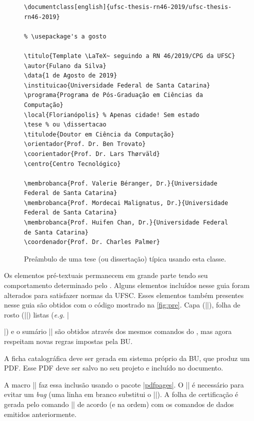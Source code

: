 \documentclass[embeddedlogo]{../ufsc-thesis-rn46-2019}
\begin{document}
\begin{figure}[tb]
  \centering
  \caption{Preâmbulo de uma tese (ou dissertação) típica usando esta classe.}
  \label{fig:preambulo}

  \begin{verbatim}
\documentclass[english]{ufsc-thesis-rn46-2019/ufsc-thesis-rn46-2019}

% \usepackage's a gosto

\titulo{Template \LaTeX~ seguindo a RN 46/2019/CPG da UFSC}
\autor{Fulano da Silva}
\data{1 de Agosto de 2019}
\instituicao{Universidade Federal de Santa Catarina}
\programa{Programa de Pós-Graduação em Ciências da Computação}
\local{Florianópolis} % Apenas cidade! Sem estado
\tese % ou \dissertacao
\titulode{Doutor em Ciência da Computação}
\orientador{Prof. Dr. Ben Trovato}
\coorientador{Prof. Dr. Lars Thørväld}
\centro{Centro Tecnológico}

\membrobanca{Prof. Valerie Béranger, Dr.}{Universidade Federal de Santa Catarina}
\membrobanca{Prof. Mordecai Malignatus, Dr.}{Universidade Federal de Santa Catarina}
\membrobanca{Prof. Huifen Chan, Dr.}{Universidade Federal de Santa Catarina}
\coordenador{Prof. Dr. Charles Palmer}
  \end{verbatim}
\end{figure}

Os elementos pré-textuais permanecem em grande parte tendo seu comportamento
determinado pelo \abnTeX. Alguns elementos incluídos nesse guia foram alterados
para satisfazer normas da UFSC. Esses elementos também presentes
nesse guia são obtidos com o código mostrado na \autoref{fig:pre}. Capa
(\mt|\imprimircapa|), folha de rosto (\mt|\imprimirfolhaderosto*|) listas
(\emph{e.g.} \mt|\listoffigures*|) e o sumário \mt|\tableofcontents*| são
obtidos através dos mesmos comandos do \abnTeX, mas agora respeitam novas
regras impostas pela BU.

A ficha catalográfica deve ser gerada em sistema próprio da BU, que produz um
PDF. Esse PDF deve ser salvo no seu projeto e incluído no documento.

A macro \mt|| faz essa inclusão usando o
pacote \href{https://www.ctan.org/pkg/pdfpages}{\mt|pdfpages|}. O \mt|\protect|
é necessário para evitar um \emph{bug} (uma linha em branco substitui o
\mt|\protect|).  A folha de certificação é gerada pelo comando
\mt|\imprimirfolhadecertificacao| de acordo (e na ordem) com os comandos de
dados emitidos anteriormente.
\end{document}
